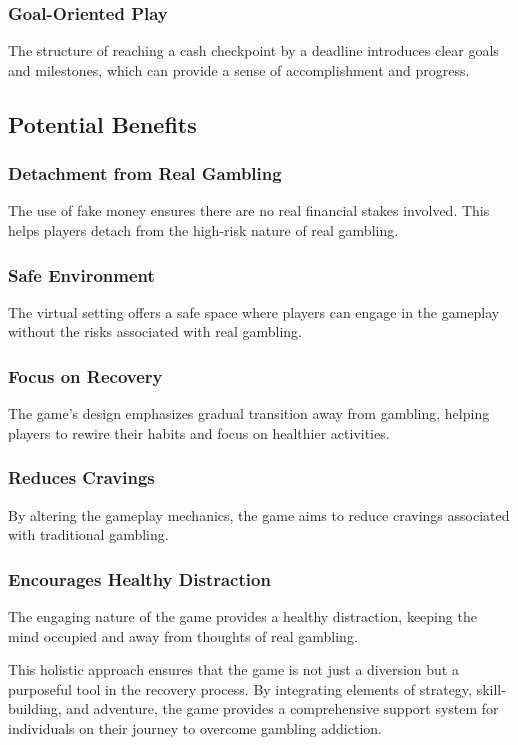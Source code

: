 \documentclass[9pt,a4paper,twoside]{tau-class/tau}
\begin{document}
    \subsubsection{Goal-Oriented Play}
    The structure of reaching a cash checkpoint by a deadline introduces clear goals and milestones, which can provide a sense of accomplishment and progress. 

    \subsection{Potential Benefits}
    
    \subsubsection{Detachment from Real Gambling}
    The use of fake money ensures there are no real financial stakes involved. This helps players detach from the high-risk nature of real gambling.
    
    \subsubsection{Safe Environment}
    The virtual setting offers a safe space where players can engage in the gameplay without the risks associated with real gambling. 
    
    \subsubsection{Focus on Recovery}
    The game's design emphasizes gradual transition away from gambling, helping players to rewire their habits and focus on healthier activities. 
       
    \subsubsection{Reduces Cravings}
    By altering the gameplay mechanics, the game aims to reduce cravings associated with traditional gambling. 
    
    \subsubsection{Encourages Healthy Distraction} 
    The engaging nature of the game provides a healthy distraction, keeping the mind occupied and away from thoughts of real gambling. 
    
    This holistic approach ensures that the game is not just a diversion but a purposeful tool in the recovery process. By integrating elements of strategy, skill-building, and adventure, the game provides a comprehensive support system for individuals on their journey to overcome gambling addiction. 
    
\end{document}
